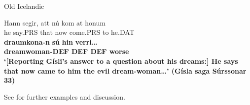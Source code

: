 
\item 

Old Icelandic



 \ea\label{}
\gll Hann  segir,  att  nú  kom  at  honum\\


he  say.PRS   that  now  come.PRS  to  he.DAT\\

 \ea\label{}
\gll \textbf{draumkona}\textbf{{}-n}\textbf{  sú} \textbf{hin} \textbf{verri…}\\

\bfseries
dreamwoman-DEF  DEF  DEF  worse\\

\glt ‘[Reporting Gísli’s answer to a question about his dreams:] He says that now came to him the evil dream-woman…’ (Gísla saga Súrssonar 33)

\z

 See \citet{Dahl2003} for further examples and discussion.


